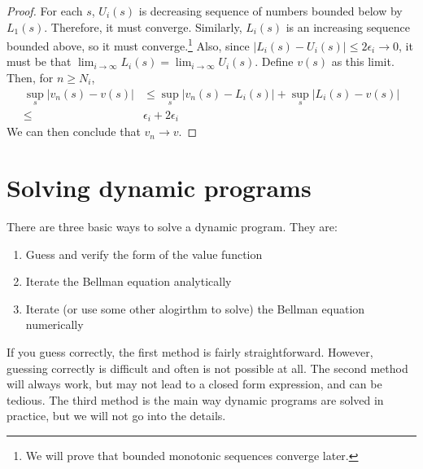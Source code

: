 \begin{proof}
  For each $s$, $U_i(s)$ is decreasing sequence of numbers bounded
  below by $L_1(s)$. Therefore, it must converge. Similarly, $L_i(s)$
  is an increasing sequence bounded above, so it must
  converge.\footnote{We will prove that bounded monotonic sequences
    converge later.} Also, since $|L_i(s) - U_i(s) | \leq 2\epsilon_i
  \to 0$, it must be that $\lim_{i\to \infty} L_i(s) = \lim_{i\to
    \infty } U_i(s)$. Define $v(s)$ as this limit. Then, for $n \geq N_i$,
  \begin{align*}
    \sup_{s} \left\vert v_n(s) - v(s) \right\vert & 
    \leq \sup_s \left\vert v_n(s) - L_i(s) \right\vert + \sup_s
    \left\vert L_i(s) - v(s) \right\vert \\
    \leq & \epsilon_i + 2\epsilon_i
  \end{align*}
  We can then conclude that $v_n \to v$.   
\end{proof}   
 
\section{Solving dynamic programs} 

There are three basic ways to solve a dynamic program. They are:
\begin{enumerate}
\item Guess and verify the form of the value function
\item Iterate the Bellman equation analytically
\item Iterate (or use some other alogirthm to solve)  the Bellman equation numerically
\end{enumerate}
If you guess correctly, the first method is fairly
straightforward. However, guessing correctly is difficult and often is
not possible at all. The second method will always work, but may not
lead to a closed form expression, and can be tedious. The third method
is the main way dynamic programs are solved in practice, but we will
not go into the details.


